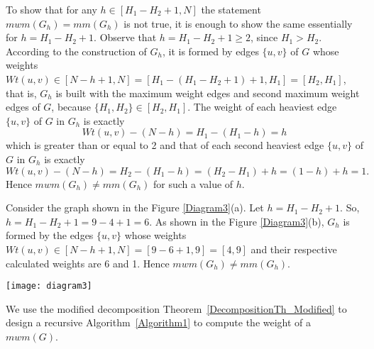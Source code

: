 \documentclass[runningheads,a4paper]{llncs}
\begin{document}
To show that for any $h \in [H_1-H_2 + 1, N]$ the statement
$\textit{mwm}(G_h)=\textit{mm}(G_h)$ is not true, it is enough to show the same
essentially for $h=H_1-H_2+1$. Observe that $h = H_1-H_2+1 \geq 2$,
since $H_1 > H_2$. According to the construction of $G_h$, it is formed
by edges $\{u,v\}$ of $G$ whose weights $\textit{Wt}(u,v) \in [N-h+1,N] = [H_1-(H_1-H_2+1)+1,
H_1]=[H_2,H_1]$, that is, $G_h$ is built with the maximum weight edges and second
maximum weight edges of $G$,  because $\{H_1,H_2\}\in [H_2, H_1]$.
The weight of each heaviest edge $\{u,v\}$ of $G$ in $G_h$
is exactly 
$$\textit{Wt}(u,v)-(N-h) = H_1-(H_1-h) = h$$ which is greater than or equal to 2 and that of each second
heaviest edge $\{u,v\}$ of $G$ in $G_h$ is exactly $$\textit{Wt}(u,v)-(N-h) = H_2-(H_1-h) =
(H_2-H_1)+h=(1-h)+h=1.$$ 
Hence $\textit{mwm}(G_h) \neq \textit{mm}(G_h)$ for such
a value of $h$.

\begin{example}
Consider the graph shown in the Figure \ref{Diagram3}(a). Let $h =
H_1-H_2+1$. So, $h=H_1-H_2+1=9-4+1=6$.
As shown in the Figure \ref{Diagram3}(b), $G_h$ is
formed by the edges $\{u,v\}$ whose weights $\textit{Wt}(u,v) \in [N-h+1,N]=[9-6+1,9] =[4,9]$ and their respective calculated weights are 6 and 1. Hence
$\textit{mwm}(G_h) \neq \textit{mm}(G_h)$.
\begin{figure*}[htpb]
\centering
\texttt{[image: diagram3]}
\caption[Example for $H_1-H_2 < h \leq N$, $\textit{mwm}(G_h) \neq \textit{mm}(G_h)$.]{{\bf(a)} An undirected bipartite graph $G$ with positive integer weights on the edges.  {\bf(b)} Considering $h=H_1-H_2+1=6$,
$G_h$ is extracted, but $\textit{mwm}(G_h) \neq \textit{mm}(G_h)$.}
\label{Diagram3}
\end{figure*}
\end{example}


We use the modified decomposition Theorem~\ref{DecompositionTh_Modified} to design a recursive Algorithm~\ref{Algorithm1} to compute the weight of a $\textit{mwm}(G)$.
\end{document}
